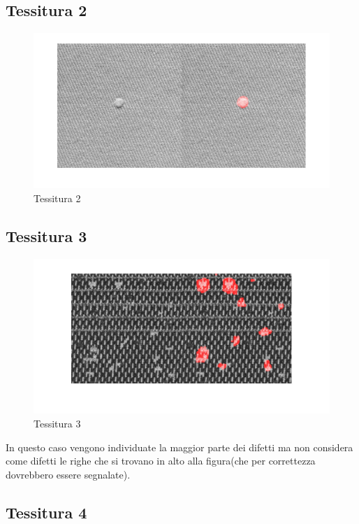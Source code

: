 \documentclass{article}
\begin{document}
\newpage

\subsection{Tessitura 2}

\begin{figure}[h!]
	\centering
	\includegraphics[width=\textwidth]{results/res2.jpg}
	\caption{Tessitura 2}
\end{figure}

\subsection{Tessitura 3}

\begin{figure}[h!]
	\centering
	\includegraphics[width=\textwidth]{results/res3.jpg}
	\caption{Tessitura 3}
\end{figure}

In questo caso vengono individuate la maggior parte dei difetti ma non considera come difetti le righe che si trovano in alto alla figura(che per correttezza dovrebbero essere segnalate).

\subsection{Tessitura 4}
\end{document}
